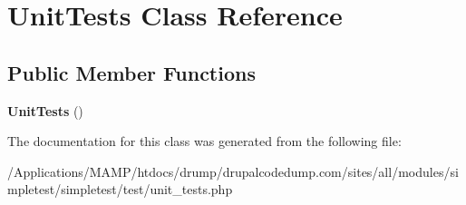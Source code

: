 \hypertarget{class_unit_tests}{
\section{UnitTests Class Reference}
\label{class_unit_tests}
}
\subsection*{Public Member Functions}
\begin{DoxyCompactItemize}
\item 
\hypertarget{class_unit_tests_afe926d14c2c6fecaf82dfe1154cf03f3}{
{\bfseries UnitTests} ()}
\label{class_unit_tests_afe926d14c2c6fecaf82dfe1154cf03f3}

\end{DoxyCompactItemize}


The documentation for this class was generated from the following file:\begin{DoxyCompactItemize}
\item 
/Applications/MAMP/htdocs/drump/drupalcodedump.com/sites/all/modules/simpletest/simpletest/test/unit\_\-tests.php\end{DoxyCompactItemize}

